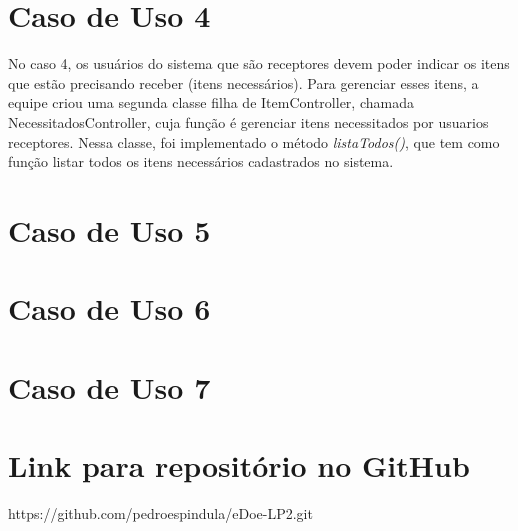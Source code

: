 \documentclass[journal,12pt,onecolumn,draftclsnofoot,]{article}
\begin{document}
	
	\section{Caso de Uso 4}
	No caso 4, os usuários do sistema que são receptores devem poder indicar os itens que estão precisando receber (itens necessários). Para gerenciar esses itens, a equipe criou uma segunda classe filha de ItemController, chamada NecessitadosController, cuja função é gerenciar itens necessitados por usuarios receptores. Nessa classe, foi implementado o método \textit{listaTodos()}, que tem como função listar todos os itens necessários cadastrados no sistema.
	
	\section{Caso de Uso 5}
	
	
	\section{Caso de Uso 6}

	
	\section{Caso de Uso 7}	
		
	
	\section{Link para repositório no GitHub}
	https://github.com/pedroespindula/eDoe-LP2.git
	
\end{document}
